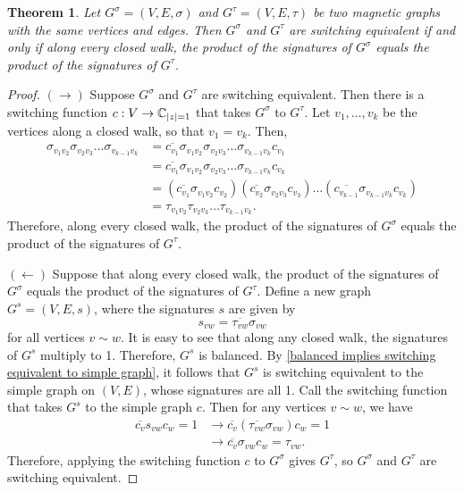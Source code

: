 \documentclass[12pt]{article}
\newtheorem{thm}{Theorem}
\theoremstyle{definition}
\newcommand{\C}{\mathbb C}
\DeclarePairedDelimiter\abs{\lvert}{\rvert}%
\begin{document}
\begin{thm}
Let $G^\sigma = (V, E, \sigma)$ and $G^\tau = (V, E, \tau)$ be two magnetic graphs with the same vertices and edges. Then $G^\sigma$ and $G^\tau$ are switching equivalent if and only if along every closed walk, the product of the signatures of $G^\sigma$ equals the product of the signatures of $G^\tau$.
\end{thm}
\begin{proof}
$(\rightarrow)$ Suppose $G^\sigma$ and $G^\tau$ are switching equivalent. Then there is a switching function $c: V \rightarrow \C_{\abs*z = 1}$ that takes $G^\sigma$ to $G^\tau$. Let $v_1, \dots, v_k$ be the vertices along a closed walk, so that $v_1 = v_k$. Then,
\begin{align*}
\sigma_{v_1 v_2} \sigma_{v_2 v_3} \dots \sigma_{v_{k-1} v_k}
&= \overline{c_{v_1}} \sigma_{v_1 v_2} \sigma_{v_2 v_3} \dots \sigma_{v_{k-1} v_k} c_{v_1} \\
&= \overline{c_{v_1}} \sigma_{v_1 v_2} \sigma_{v_2 v_3} \dots \sigma_{v_{k-1} v_k} c_{v_k} \\
&= (\overline{c_{v_1}} \sigma_{v_1 v_2} c_{v_2}) (\overline{c_{v_2}} \sigma_{v_2 v_3} c_{v_3}) \dots (\overline{c_{v_{k-1}}} \sigma_{v_{k-1} v_k} c_{v_k}) \\
&= \tau_{v_1 v_2} \tau_{v_2 v_3} \dots \tau_{v_{k-1} v_k}.
\end{align*} 
Therefore, along every closed walk, the product of the signatures of $G^\sigma$ equals the product of the signatures of $G^\tau$.

$(\leftarrow)$ Suppose that along every closed walk, the product of the signatures of $G^\sigma$ equals the product of the signatures of $G^\tau$. Define a new graph $G^s = (V, E, s)$, where the signatures $s$ are given by 
$$s_{vw} = \overline{\tau_{vw}} \sigma_{vw}$$ 
for all vertices $v \sim w$. It is easy to see that along any closed walk, the signatures of $G^s$ multiply to 1. Therefore, $G^s$ is balanced. By \cref{balanced implies switching equivalent to simple graph}, it follows that $G^s$ is switching equivalent to the simple graph on $(V, E)$, whose signatures are all 1. Call the switching function that takes $G^s$ to the simple graph $c$. Then for any vertices $v \sim w$, we have
\begin{align*}
\overline{c_v} s_{vw} c_w = 1
&\rightarrow \overline{c_v} \left(\overline{\tau_{vw}} \sigma_{vw}\right) c_w = 1 \\
&\rightarrow \overline{c_v} \sigma_{vw} c_w = \tau_{vw}.
\end{align*}
Therefore, applying the switching function $c$ to $G^\sigma$ gives $G^\tau$, so $G^\sigma$ and $G^\tau$ are switching equivalent.
\end{proof}
\end{document}
